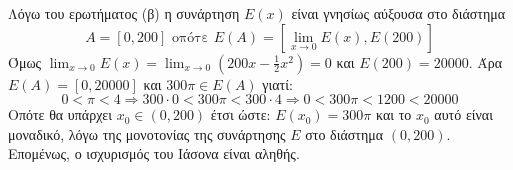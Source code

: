 \begin{alist}
    \item Λόγω του ερωτήματος (β) η συνάρτηση $E(x)$ είναι γνησίως αύξουσα στο διάστημα
    \[ A = [0, 200] \text{ οπότε } E(A) = \left[\lim_{x \to 0} E(x), E(200)\right] \]
    Όμως $\lim_{x \to 0} E(x) = \lim_{x \to 0} \left(200x - \frac{1}{2}x^2\right) = 0$ και $E(200) = 20000$.
    Άρα $E(A) = [0, 20000]$ και $300\pi \in E(A)$ γιατί:
    \[ 0 < \pi < 4 \Rightarrow 300 \cdot 0 < 300\pi < 300 \cdot 4 \Rightarrow 0 < 300\pi < 1200 < 20000 \]
    Οπότε θα υπάρχει $x_0 \in (0, 200)$ έτσι ώστε: $E(x_0) = 300\pi$ και το $x_0$ αυτό είναι μοναδικό, λόγω της μονοτονίας της συνάρτησης $E$ στο διάστημα $(0, 200)$. Επομένως, ο ισχυρισμός του Ιάσονα είναι αληθής.
\end{alist}